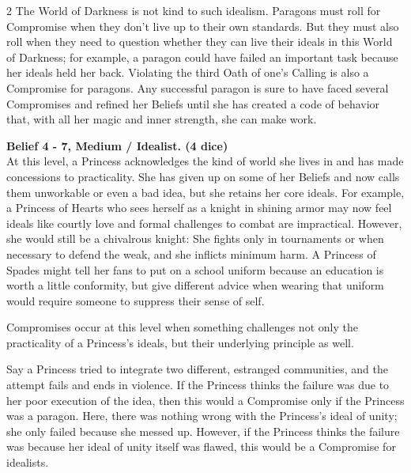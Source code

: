 \begin{multicols}{2}
The World of Darkness is not kind to such idealism. Paragons must roll for Compromise when they don't live up to their own standards. But they must also roll when 
they need to question whether they can live their ideals in this World of Darkness; for example, a paragon could have failed an important task because her ideals held her back. Violating the third Oath of one's Calling is also a Compromise for paragons. Any successful paragon is sure to have faced several Compromises and refined her Beliefs until she has created a code of behavior that, with all her magic and inner strength, she can make work.

\noindent\textbf{Belief 4 - 7, Medium / Idealist. (4 dice)} \\

\noindent At this level, a Princess acknowledges the kind of world she lives in and has made concessions to practicality. She has given up on some of her Beliefs and now calls them unworkable or even a bad idea, but she retains her core ideals. For example, a Princess of Hearts who sees herself as a knight in shining armor may now feel ideals like courtly love and formal challenges to combat are impractical. However, she would still be a chivalrous knight: She fights only in tournaments or when necessary to defend the weak, and she inflicts minimum harm. A Princess of Spades might tell her fans to put on a school uniform because an education is worth a little conformity, but give different advice when wearing that uniform would require someone to suppress their sense of self. 

Compromises occur at this level when something challenges not only the practicality of a Princess's ideals, but their underlying principle as well. 

Say a Princess tried to integrate two different, estranged communities, and the attempt fails and ends in violence. If the Princess thinks the failure was due to her poor execution of the idea, then this would a Compromise only if the Princess was a paragon. Here, there was nothing wrong with the Princess's ideal of unity; she only failed because she messed up. However, if the Princess thinks the failure was because her ideal of unity itself was flawed, this would be a Compromise for idealists. 


\end{multicols}
